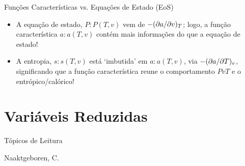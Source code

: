     \begin{frame}{Funções Características vs. Equações de Estado (EoS)}
        \begin{itemize}
            \item<1-> A equação de estado, \alert{$P\!:\!P(T, v)$} vem de \alert{$-(\partial {a}/\partial {v})_{T}$};
                logo, a função característica \alert{$a\!:\!a(T, v)$} contém mais informações do
                que a equação de estado!
                \vspace*\bigskipamount
            \item<2-> A entropia, \alert{$s\!:\!s(T, v)$} está `imbutida' em \alert{$a\!:\!a(T,
                v)$}, via \alert{$-(\partial {a}/\partial {T})_{v}$}, significando que a função característica reune o
                comportamento $PvT$ e o entrópico/calórico!
        \end{itemize}
    \end{frame}

\section{Variáveis Reduzidas}

    \begin{frame}{Tópicos de Leitura}
        \begin{thebibliography}{Çengel, Y.~A., 2013}
                Naaktgeboren, C.
        \end{thebibliography}
    \end{frame}




